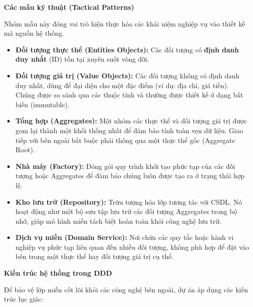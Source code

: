 \vspace{0.5em}
\textbf{Các mẫu kỹ thuật (Tactical Patterns)}

Nhóm mẫu này đóng vai trò hiện thực hóa các khái niệm nghiệp vụ vào thiết kế mã nguồn hệ thống.

\begin{itemize}
\item \textbf{Đối tượng thực thể (Entities Objects):} Các đối tượng có \textbf{định danh duy nhất} (ID) tồn tại xuyên suốt vòng đời.

\item \textbf{Đối tượng giá trị (Value Objects):} Các đối tượng không có định danh duy nhất, dùng để đại diện cho một đặc điểm (ví dụ: địa chỉ, giá tiền). Chúng được so sánh qua các thuộc tính và thường được thiết kế ở dạng bất biến (immutable).

\item \textbf{Tổng hợp (Aggregates):} Một nhóm các thực thể và đối tượng giá trị được gom lại thành một khối thống nhất để đảm bảo tính toàn vẹn dữ liệu. Giao tiếp với bên ngoài bắt buộc phải thông qua một thực thể gốc (Aggregate Root).

\item \textbf{Nhà máy (Factory):} Đóng gói quy trình khởi tạo phức tạp của các đối tượng hoặc Aggregates để đảm bảo chúng luôn được tạo ra ở trạng thái hợp lệ.

\item \textbf{Kho lưu trữ (Repository):} Trừu tượng hóa lớp tương tác với CSDL. Nó hoạt động như một bộ sưu tập lưu trữ các đối tượng Aggregates trong bộ nhớ, giúp mô hình miền tách biệt hoàn toàn khỏi công nghệ lưu trữ.

\item \textbf{Dịch vụ miền (Domain Service):} Nơi chứa các quy tắc hoặc hành vi nghiệp vụ phức tạp liên quan đến nhiều đối tượng, không phù hợp để đặt vào bên trong một thực thể hay đối tượng giá trị cụ thể.
\end{itemize}

\vspace{0.5em}
\textbf{Kiến trúc hệ thống trong DDD}

Để bảo vệ lớp miền cốt lõi khỏi các công nghệ bên ngoài,
dự án áp dụng các kiến trúc lục giác:

